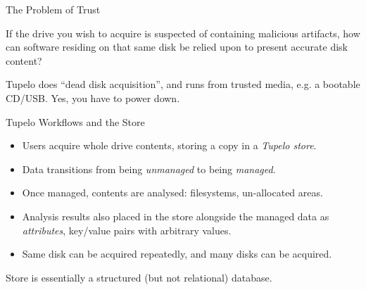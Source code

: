 \documentclass{beamer}
\begin{document}

\begin{frame}{The Problem of Trust}

If the drive you wish to acquire is suspected of containing
malicious artifacts, how can software residing on that same disk
be relied upon to present accurate disk content? 

\vskip 20pt

Tupelo does ``dead disk acquisition'', and runs from trusted media,
e.g. a bootable CD/USB.  Yes, you have to power down.

\end{frame}


\begin{frame}{Tupelo Workflows and the Store}

\begin{itemize}
\item
Users acquire whole drive contents, storing a copy in a {\em Tupelo
  store}.

\item
Data transitions from being {\em unmanaged} to being {\em managed}.

\item
Once managed, contents are analysed: filesystems, un-allocated
areas.

\item
Analysis results also placed in the store alongside the managed data
as {\em attributes}, key/value pairs with arbitrary values.

\item
Same disk can be acquired repeatedly, and many disks can be acquired.

\end{itemize}

Store is essentially a structured (but not relational) database.

\end{frame}


\end{document}
